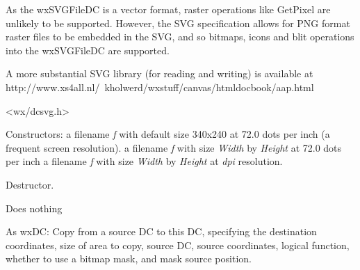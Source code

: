 As the wxSVGFileDC is a vector format, raster operations like GetPixel are unlikely to be supported.
However, the SVG specification allows for PNG format raster files to be embedded in the SVG, and so 
bitmaps, icons and blit operations into the wxSVGFileDC are supported.

A more substantial SVG library (for reading and writing) is available at 
http://www.xs4all.nl/~kholwerd/wxstuff/canvas/htmldocbook/aap.html




<wx/dcsvg.h>






  \rtfsp
{}  \rtfsp
{} \rtfsp

Constructors: 
a filename {\it f} with default size 340x240 at 72.0 dots per inch (a frequent screen resolution).
a filename {\it f} with size {\it Width} by {\it Height} at 72.0 dots per inch 
a filename {\it f} with size {\it Width} by {\it Height} at {\it dpi} resolution.



Destructor.

\label{wxdcbegindrawing}

Does nothing

\label{wxdcblit}


As wxDC: Copy from a source DC to this DC, specifying the destination
coordinates, size of area to copy, source DC, source coordinates,
logical function, whether to use a bitmap mask, and mask source position.

